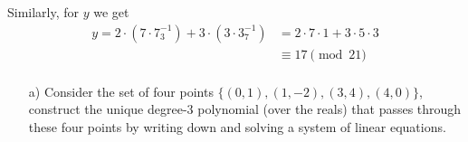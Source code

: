 \documentclass[]{article}
\begin{document}
\begin{qunlist}
{{\begin{enumerate}
Similarly, for $y$ we get
\begin{align*}
y = 2 \cdot (7 \cdot 7^{-1}_3) + 3 \cdot( 3 \cdot 3^{-1}_7) &= 2 \cdot 7 \cdot 1 + 3 \cdot 5 \cdot 3 \\
&\equiv \boxed{17 \pmod{21}} \\
\end{align*}

  \end{enumerate}
}}\fi



\newpage

\begin{itemize}
\qpart
\item[a)] Consider the set of four points $\{(0,1), (1,-2), (3,4), (4,0)\}$, construct the unique degree-$3$ polynomial (over the reals) that passes through these four points by writing down and solving a system of linear equations.



\end{itemize}
\end{qunlist}
\end{document}
